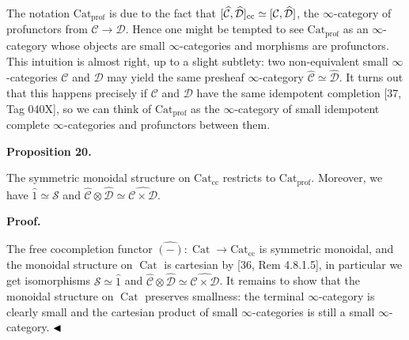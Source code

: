 \documentclass[10pt,a4paper]{article}
\begin{document}
 
The notation $\operatorname{Cat_{prof}}$ is due to the fact that $[\widehat{\mathcal{C}},\widehat{\mathcal{D}}]_{\textnormal{cc}}\simeq[{\mathcal{C}},\widehat{\mathcal{D}}]$, the $\infty$-category of profunctors from ${\mathcal{C}}\to{\mathcal{D}}$. Hence one might be tempted to see $\operatorname{Cat_{prof}}$ as an $\infty$-category whose objects are small $\infty$-categories and morphisms are profunctors. This intuition is almost right, up to a slight subtlety: two non-equivalent small $\infty$-categories ${\mathcal{C}}$ and ${\mathcal{D}}$ may yield the same presheaf $\infty$-category $\widehat{\mathcal{C}}\simeq\widehat{\mathcal{D}}$. It turns out that this happens precisely if ${\mathcal{C}}$ and ${\mathcal{D}}$ have the same idempotent completion [37, Tag 040X], so we can think of $\operatorname{Cat_{prof}}$ as the $\infty$-category of small idempotent complete $\infty$-categories and profunctors between them.\par
 
 
 
 
\par\medskip\noindent\textbf{Proposition 20.}\par
 
 
The symmetric monoidal structure on $\operatorname{Cat_{cc}}$ restricts to $\operatorname{Cat_{prof}}$. Moreover, we have $\widehat{1}\simeq{\mathcal{S}}$ and $\widehat{\mathcal{C}}\otimes\widehat{\mathcal{D}}\simeq\widehat{{\mathcal{C}}\times{\mathcal{D}}}$.\par
 
 
 
 
 
\par\medskip\noindent\textbf{Proof.}\par
 
 
The free cocompletion functor $\widehat{(-)}:\operatorname{Cat}\to\operatorname{Cat_{cc}}$ is symmetric monoidal, and the monoidal structure on $\operatorname{Cat}$ is cartesian by [36, Rem 4.8.1.5], in particular we get isomorphisms ${\mathcal{S}}\simeq\widehat{1}$ and $\widehat{\mathcal{C}}\otimes\widehat{\mathcal{D}}\simeq\widehat{{\mathcal{C}}\times{\mathcal{D}}}$. It remains to show that the monoidal structure on $\operatorname{Cat}$ preserves smallness: the terminal $\infty$-category is clearly small and the cartesian product of small $\infty$-categories is still a small $\infty$-category. $\hfill\blacktriangleleft$\par
 
\end{document}
